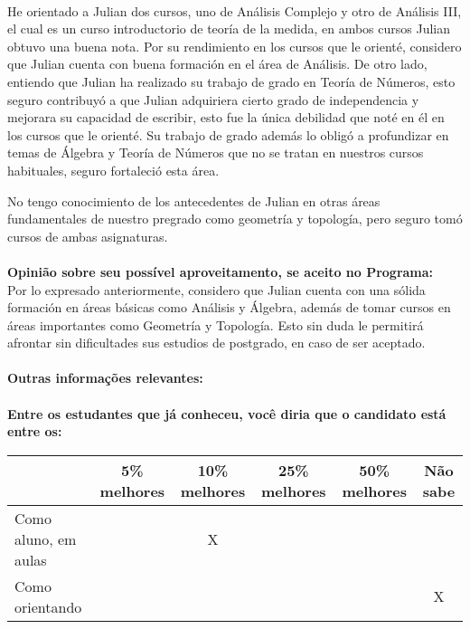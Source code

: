 \documentclass[11pt]{article}
\begin{document}
\\He orientado a Julian dos cursos, uno de Análisis Complejo y otro de Análisis III, el cual es un curso introductorio de teoría de la medida, en ambos cursos Julian obtuvo una buena nota. Por su rendimiento en los cursos que le orienté, considero que Julian cuenta con buena formación en el área de Análisis. De otro lado, entiendo que Julian ha realizado su trabajo de grado en Teoría de Números, esto seguro contribuyó a que Julian adquiriera cierto grado de independencia y mejorara su capacidad de escribir, esto fue la única debilidad que noté en él en los cursos que le orienté. Su trabajo de grado además lo obligó a profundizar en temas de Álgebra y Teoría de Números que no se tratan en nuestros cursos habituales, seguro fortaleció esta área.

No tengo conocimiento de los antecedentes de Julian en otras áreas fundamentales de nuestro pregrado como geometría y topología, pero seguro tomó cursos de ambas asignaturas.\\
\\
\textbf{Opinião sobre seu possível aproveitamento, se aceito no Programa:}
\\Por lo expresado anteriormente, considero que Julian cuenta con una sólida formación en áreas básicas como Análisis y Álgebra, además de tomar cursos en áreas importantes como Geometría y Topología. Esto sin duda le permitirá afrontar sin dificultades sus estudios de postgrado, en caso de ser aceptado.\\ 
\\
\textbf{Outras informações relevantes:} \\
\\[0.3cm]
\textbf{Entre os estudantes que já conheceu, você diria que o candidato está entre os:}
\\
\begin{tabular}{|l|c|c|c|c|c|}
\hline
 & 5\% melhores & 10\% melhores & 25\% melhores & 50\% melhores & Não sabe \\
\hline
Como aluno, em aulas &  & X &  &  & \\
\hline
Como orientando &  &  &  &  & X\\
\hline
\end{tabular}
\end{document}
